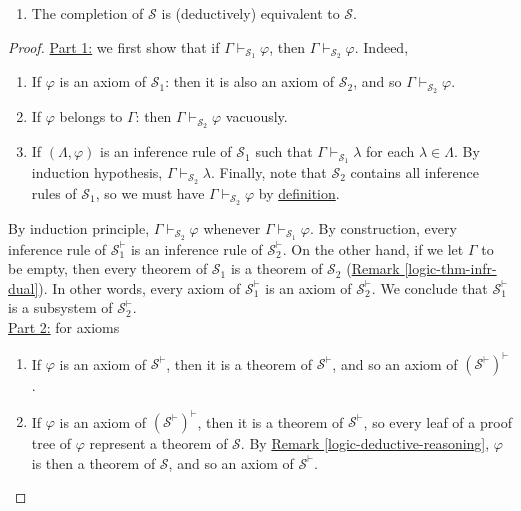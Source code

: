 \documentclass{treatise}
\begin{document}
\begin{shaded}
\begin{proposition}
\begin{enumerate}
\begin{enumerate}
        \item The completion of $\mathcal{S}$ is (deductively) equivalent to $\mathcal{S}$.
    \end{enumerate}
\end{enumerate}
\end{proposition}
\begin{proof}
\underline{Part 1:} we first show that if $\Gamma \vdash_{\mathcal{S}_1} \varphi$, then $\Gamma \vdash_{\mathcal{S}_2} \varphi$. Indeed,
\begin{enumerate}
    \item If $\varphi$ is an axiom of $\mathcal{S}_1$: then it is also an axiom of $\mathcal{S}_2$, and so $\Gamma \vdash_{\mathcal{S}_2} \varphi$.
    \item If $\varphi$ belongs to $\Gamma$: then $\Gamma \vdash_{\mathcal{S}_2} \varphi$ vacuously.
    \item If $(\Lambda, \varphi)$ is an inference rule of $\mathcal{S}_1$ such that $\Gamma \vdash_{\mathcal{S}_1} \lambda$ for each $\lambda \in \Lambda$. By induction hypothesis, $\Gamma \vdash_{\mathcal{S}_2} \lambda$. Finally, note that $\mathcal{S}_2$ contains all inference rules of $\mathcal{S}_1$, so we must have $\Gamma \vdash_{\mathcal{S}_2} \varphi$ by \hyperref[logic-ent-rule]{definition}.
\end{enumerate}
By induction principle, $\Gamma \vdash_{\mathcal{S}_2} \varphi$ whenever $\Gamma \vdash_{\mathcal{S}_1} \varphi$. By construction, every inference rule of $\mathcal{S}_1^\vdash$ is an inference rule of $\mathcal{S}_2^\vdash$. On the other hand, if we let $\Gamma$ to be empty, then every theorem of $\mathcal{S}_1$ is a theorem of $\mathcal{S}_2$ (\hyperref[logic-thm-infr-dual]{Remark \ref*{logic-thm-infr-dual}}). In other words, every axiom of $\mathcal{S}_1^\vdash$ is an axiom of $\mathcal{S}_2^\vdash$. We conclude that $\mathcal{S}_1^\vdash$ is a subsystem of $\mathcal{S}_2^\vdash$.
\\
\underline{Part 2:} for axioms
\begin{enumerate}
    \item If $\varphi$ is an axiom of $\mathcal{S}^{\vdash}$, then it is a theorem of $\mathcal{S}^{\vdash}$, and so an axiom of $(\mathcal{S}^{\vdash})^{\vdash}$.
    \item If $\varphi$ is an axiom of $(\mathcal{S}^{\vdash})^{\vdash}$, then it is a theorem of $\mathcal{S}^{\vdash}$, so every leaf of a proof tree of $\varphi$ represent a theorem of $\mathcal{S}$. By \hyperref[logic-deductive-reasoning]{Remark \ref*{logic-deductive-reasoning}}, $\varphi$ is then a theorem of $\mathcal{S}$, and so an axiom of $\mathcal{S}^{\vdash}$.

\end{enumerate}
\end{proof}
\end{shaded}
\end{document}
